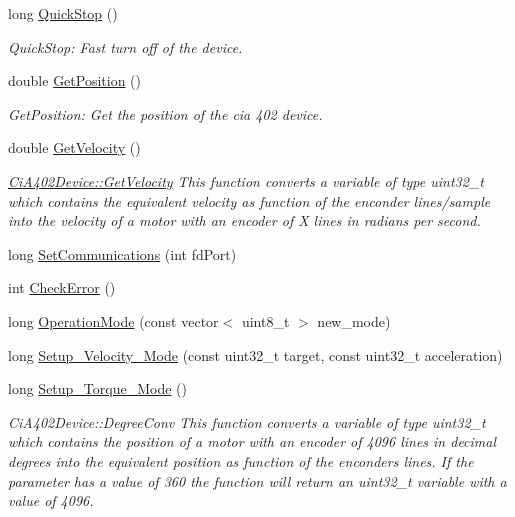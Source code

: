\begin{DoxyCompactItemize}
long \hyperlink{classCiA402Device_a8573afbf420c29aa86cd215d74f4e4e3}{Quick\+Stop} ()
\begin{DoxyCompactList}\small\item\em Quick\+Stop\+: Fast turn off of the device. \end{DoxyCompactList}\item 
double \hyperlink{classCiA402Device_ac8d9e36e6f457565cac7d26d91e4a712}{Get\+Position} ()
\begin{DoxyCompactList}\small\item\em Get\+Position\+: Get the position of the cia 402 device. \end{DoxyCompactList}\item 
double \hyperlink{classCiA402Device_a54b43f6429da4c6c0241653355e81d36}{Get\+Velocity} ()
\begin{DoxyCompactList}\small\item\em \hyperlink{classCiA402Device_a54b43f6429da4c6c0241653355e81d36}{Ci\+A402\+Device\+::\+Get\+Velocity} This function converts a variable of type uint32\+\_\+t which contains the equivalent velocity as function of the enconder lines/sample into the velocity of a motor with an encoder of X lines in radians per second. \end{DoxyCompactList}\item 
long \hyperlink{classCiA402Device_abf511a7d44b62ac93ae18fe21f8d51c9}{Set\+Communications} (int fd\+Port)
\item 
int \hyperlink{classCiA402Device_af1ed15805579e85e514e7ccf4ff21e10}{Check\+Error} ()
\item 
long \hyperlink{classCiA402Device_a49f298cf0d4d2d68007b3cb396e93a17}{Operation\+Mode} (const vector$<$ uint8\+\_\+t $>$ new\+\_\+mode)
\item 
long \hyperlink{classCiA402Device_ac1db22a6a8a7d7a56590423bd7577c7b}{Setup\+\_\+\+Velocity\+\_\+\+Mode} (const uint32\+\_\+t target, const uint32\+\_\+t acceleration)
\item 
long \hyperlink{classCiA402Device_a20475438205c26cd4bcc689ed9c7fe95}{Setup\+\_\+\+Torque\+\_\+\+Mode} ()
\begin{DoxyCompactList}\small\item\em Ci\+A402\+Device\+::\+Degree\+Conv This function converts a variable of type uint32\+\_\+t which contains the position of a motor with an encoder of 4096 lines in decimal degrees into the equivalent position as function of the enconders lines. If the parameter has a value of 360 the function will return an uint32\+\_\+t variable with a value of 4096. \end{DoxyCompactList}\item 

\end{DoxyCompactItemize}
